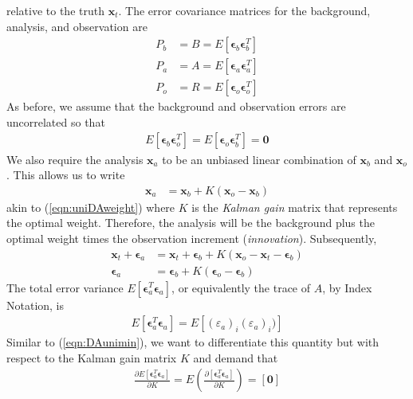 relative to the truth $\textbf{x}_t$. The error covariance matrices for the background, analysis, and observation are
\begin{subequations}
\label{eqn:OIPmat}
\begin{align}
P_b &= B = E[\bm{\epsilon}_b\bm{\epsilon}_b^T] \\
P_a &= A = E[\bm{\epsilon}_a\bm{\epsilon}_a^T] \\
P_o &= R = E[\bm{\epsilon}_o\bm{\epsilon}_o^T]
\end{align}    
\end{subequations}
As before, we assume that the background and observation errors are uncorrelated so that
\begin{align}
E[\bm{\epsilon}_b\bm{\epsilon}_o^T] = E[\bm{\epsilon}_o\bm{\epsilon}_b^T] = \textbf{0} \label{eqn:OIuncorr}
\end{align}
We also require the analysis $\textbf{x}_a$ to be an unbiased linear combination of $\textbf{x}_b$ and $\textbf{x}_o$. This allows us to write
\begin{align}
\textbf{x}_a &= \textbf{x}_b + K(\textbf{x}_o - \textbf{x}_b)  \label{eqn:OIinnov}
\end{align}
akin to (\ref{eqn:uniDAweight}) where $K$ is the \textit{Kalman gain} matrix that represents the optimal weight. Therefore, the analysis will be the background plus the optimal weight times the observation increment (\textit{innovation}). Subsequently,
\begin{align}
\textbf{x}_t + \bm{\epsilon}_a &= \textbf{x}_t + \bm{\epsilon}_b + K(\textbf{x}_o - \textbf{x}_t - \bm{\epsilon}_b) \nonumber \\
\bm{\epsilon}_a &= \bm{\epsilon}_b + K(\bm{\epsilon}_o - \bm{\epsilon}_b) \label{eqn:varakalman}
\end{align}
The total error variance $E[\bm{\epsilon}_a^T\bm{\epsilon}_a]$, or equivalently the trace of $A$, by Index Notation, is
\begin{align}
E[\bm{\epsilon}_a^T\bm{\epsilon}_a] = E[(\varepsilon_a)_i(\varepsilon_a)_i)]  
\end{align}
Similar to (\ref{eqn:DAunimin}), we want to differentiate this quantity but with respect to the Kalman gain matrix $K$ and demand that
\begin{align}
\frac{\partial E[\bm{\epsilon}_a^T\bm{\epsilon}_a]}{\partial K} = E\left(\frac{\partial [\bm{\epsilon}_a^T\bm{\epsilon}_a]}{\partial K}\right) = [\textbf{0}] \label{eqn:Kalmande0}
\end{align}
